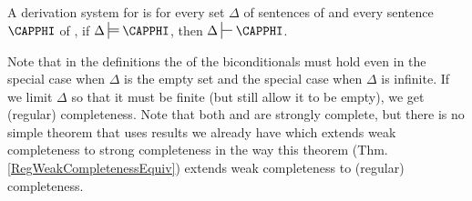 \begin{majorILnc}{}
	A derivation system  for  is  \Iff for every set $\Delta$ of sentences of  and every sentence $\CAPPHI$ of , if $\Delta\sdtstile{}{}\CAPPHI$, then $\Delta\sststile{}{}\CAPPHI$.
\end{majorILnc} 
\noindent{}Note that in the definitions the  of the biconditionals must hold even in the special case when $\Delta$ is the empty set and the special case when $\Delta$ is infinite. 
If we limit $\Delta$ so that it must be finite (but still allow it to be empty), we get (regular) completeness.
\noindent{}Note that both \GSD{} and \GQD{} are strongly complete, but there is no simple theorem that uses results we already have which extends weak completeness to strong completeness in the way this theorem (Thm. \ref{RegWeakCompletenessEquiv}) extends weak completeness to (regular) completeness.

